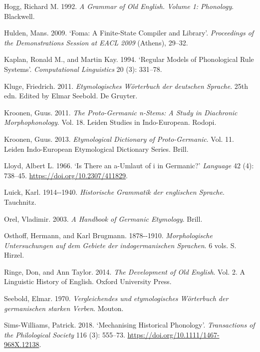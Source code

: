 \documentclass[
  british,
  a4paper,
  openany]{book}
\newlength{\cslhangindent}
\newenvironment{CSLReferences}[2] %
 {\begin{list}{}{%
  \setlength{\itemindent}{0pt}
  \setlength{\leftmargin}{0pt}
  \setlength{\parsep}{0pt}
  \ifodd #1
   \setlength{\leftmargin}{\cslhangindent}
   \setlength{\itemindent}{-1\cslhangindent}
  \fi
  \setlength{\itemsep}{#2\baselineskip}}}
 {\end{list}}
\begin{document}
\begin{CSLReferences}{1}{1}
Hogg, Richard M. 1992. \emph{A Grammar of Old English. Volume 1:
Phonology}. Blackwell.

Hulden, Mans. 2009. {`Foma: A Finite-State Compiler and Library'}.
\emph{Proceedings of the Demonstrations Session at EACL 2009} (Athens),
29--32.

Kaplan, Ronald M., and Martin Kay. 1994. {`Regular Models of
Phonological Rule Systems'}. \emph{Computational Linguistics} 20 (3):
331--78.

Kluge, Friedrich. 2011. \emph{{Etymologisches W{ö}rterbuch der deutschen
Sprache}}. 25th edn. Edited by Elmar Seebold. De Gruyter.

Kroonen, Guus. 2011. \emph{The {Proto-Germanic} n-Stems: A Study in
Diachronic Morphophonology}. Vol. 18. Leiden Studies in Indo-European.
Rodopi.

Kroonen, Guus. 2013. \emph{Etymological Dictionary of {Proto-Germanic}}.
Vol. 11. Leiden Indo-European Etymological Dictionary Series. Brill.

Lloyd, Albert L. 1966. {`Is There an {a-}Umlaut of {i} in {Germanic}?'}
\emph{Language} 42 (4): 738--45. \url{https://doi.org/10.2307/411829}.

Luick, Karl. 1914-\/-1940. \emph{{Historische Grammatik der englischen
Sprache}}. Tauchnitz.

Orel, Vladimir. 2003. \emph{A Handbook of {Germanic} Etymology}. Brill.

Osthoff, Hermann, and Karl Brugmann. 1878-\/-1910. \emph{{Morphologische
Untersuchungen auf dem Gebiete der indogermanischen Sprachen}}. 6 vols.
S. Hirzel.

Ringe, Don, and Ann Taylor. 2014. \emph{The Development of {Old
English}}. Vol. 2. A Linguistic History of English. Oxford University
Press.

Seebold, Elmar. 1970. \emph{{Vergleichendes und etymologisches
W{ö}rterbuch der germanischen starken Verben}}. Mouton.

Sims-Williams, Patrick. 2018. {`Mechanising Historical Phonology'}.
\emph{Transactions of the Philological Society} 116 (3): 555--73.
\url{https://doi.org/10.1111/1467-968X.12138}.


\end{CSLReferences}
\end{document}
